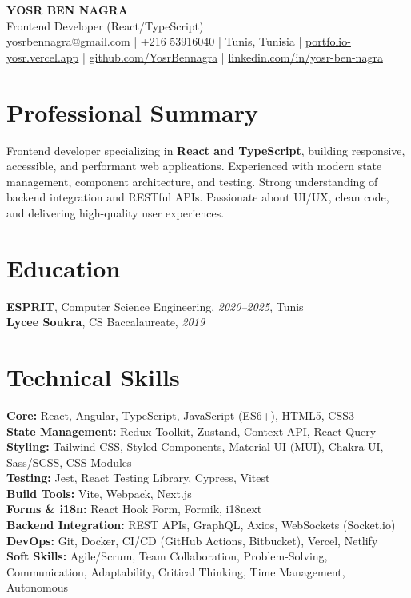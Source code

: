 \documentclass[10pt,a4paper]{article}
\begin{document}
\begin{center}
  {\Large\bfseries YOSR BEN NAGRA}\\[2pt]
  {\small Frontend Developer (React/TypeScript)}\\[3pt]
  {\footnotesize yosrbennagra@gmail.com \;|\; +216 53916040 \;|\; Tunis, Tunisia \;|\; \href{https://portfolio-yosr.vercel.app/en}{portfolio-yosr.vercel.app} \;|\; \href{https://github.com/YosrBennagra}{github.com/YosrBennagra} \;|\; \href{https://www.linkedin.com/in/yosr-ben-nagra/}{linkedin.com/in/yosr-ben-nagra}}
\end{center}

\section*{Professional Summary}
{\small
Frontend developer specializing in \textbf{React and TypeScript}, building responsive, accessible, and performant web applications. Experienced with modern state management, component architecture, and testing. Strong understanding of backend integration and RESTful APIs. Passionate about UI/UX, clean code, and delivering high-quality user experiences.
}

\vspace{4pt}

\section*{Education}
{\small
\textbf{ESPRIT}, Computer Science Engineering, \textit{2020--2025}, Tunis\\[1pt]
\textbf{Lycee Soukra}, CS Baccalaureate, \textit{2019}
}

\vspace{4pt}

\section*{Technical Skills}
{\small
\textbf{Core:} React, Angular, TypeScript, JavaScript (ES6+), HTML5, CSS3\\[2pt]
\textbf{State Management:} Redux Toolkit, Zustand, Context API, React Query\\[2pt]
\textbf{Styling:} Tailwind CSS, Styled Components, Material-UI (MUI), Chakra UI, Sass/SCSS, CSS Modules\\[2pt]
\textbf{Testing:} Jest, React Testing Library, Cypress, Vitest\\[2pt]
\textbf{Build Tools:} Vite, Webpack, Next.js\\[2pt]
\textbf{Forms \& i18n:} React Hook Form, Formik, i18next\\[2pt]
\textbf{Backend Integration:} REST APIs, GraphQL, Axios, WebSockets (Socket.io)\\[2pt]
\textbf{DevOps:} Git, Docker, CI/CD (GitHub Actions, Bitbucket), Vercel, Netlify\\[2pt]
\textbf{Soft Skills:} Agile/Scrum, Team Collaboration, Problem-Solving, Communication, Adaptability, Critical Thinking, Time Management, Autonomous
}
\end{document}
